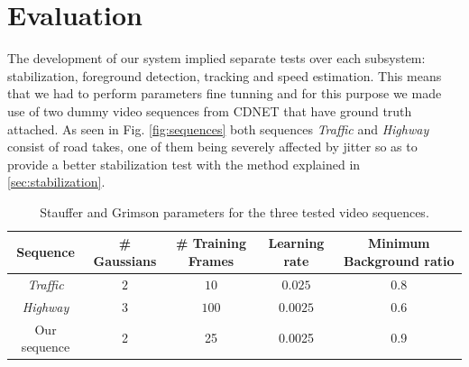 \section{Evaluation}
\label{sec:evaluation}
The development of our system implied separate tests over each subsystem: stabilization, foreground detection, tracking and speed estimation. This means that we had to perform parameters fine tunning and for this purpose we made use of two dummy video sequences from CDNET \cite{changedet} that have ground truth attached. As seen in Fig. \ref{fig:sequences} both sequences \textit{Traffic} and \textit{Highway} consist of road takes, one of them being severely affected by jitter so as to provide a better stabilization test with the method explained in \ref{sec:stabilization}.\\

\begin{table}[!h]
\renewcommand{\arraystretch}{1.4}
\centering
\begin{tabular}{|c|c|c|c|c|}
\hline
Sequence & \# Gaussians & \# Training Frames & Learning rate & Minimum Background ratio \\
\hline
\textit{Traffic} & $2$ & $10$ & $0.025$ &  $0.8$\\
\hline
\textit{Highway} & $3$ & $100$ & $0.0025$ & $0.6$ \\
\hline
Our sequence & 2 & 25 & 0.0025 & 0.9 \\
\hline
\end{tabular}
\caption{Stauffer and Grimson parameters for the three tested video sequences.}
\label{tab:bg_parameters}
\end{table}

